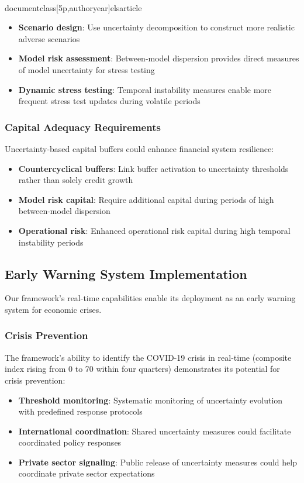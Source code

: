 \\documentclass[5p,authoryear]{elsarticle}
\begin{document}
{\begin{itemize}
    \item \textbf{Scenario design}: Use uncertainty decomposition to construct more realistic adverse scenarios
    \item \textbf{Model risk assessment}: Between-model dispersion provides direct measures of model uncertainty for stress testing
    \item \textbf{Dynamic stress testing}: Temporal instability measures enable more frequent stress test updates during volatile periods
\end{itemize}

\subsubsection{Capital Adequacy Requirements}
Uncertainty-based capital buffers could enhance financial system resilience:

\begin{itemize}
    \item \textbf{Countercyclical buffers}: Link buffer activation to uncertainty thresholds rather than solely credit growth
    \item \textbf{Model risk capital}: Require additional capital during periods of high between-model dispersion
    \item \textbf{Operational risk}: Enhanced operational risk capital during high temporal instability periods
\end{itemize}

\subsection{Early Warning System Implementation}

Our framework's real-time capabilities enable its deployment as an early warning system for economic crises.

\subsubsection{Crisis Prevention}
The framework's ability to identify the COVID-19 crisis in real-time (composite index rising from 0 to 70 within four quarters) demonstrates its potential for crisis prevention:

\begin{itemize}
    \item \textbf{Threshold monitoring}: Systematic monitoring of uncertainty evolution with predefined response protocols
    \item \textbf{International coordination}: Shared uncertainty measures could facilitate coordinated policy responses
    \item \textbf{Private sector signaling}: Public release of uncertainty measures could help coordinate private sector expectations
\end{itemize}

}
\end{document}
